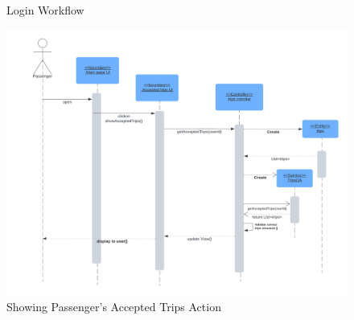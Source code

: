 \documentclass[a4paper, 12pt]{report} %
\begin{document}
        \begin{figure}[H]
            \centering
            \caption{Login Workflow}
            \label{fig:seq_dig_login}
        \end{figure}


    
        \begin{figure}
            \centering
            \includegraphics[width=0.9\linewidth]{Images/Passenger Accepted.png}
            \caption{Showing Passenger's Accepted Trips Action}
            \label{fig:seq_dig_pass_accepted}
        \end{figure}
\end{document}
